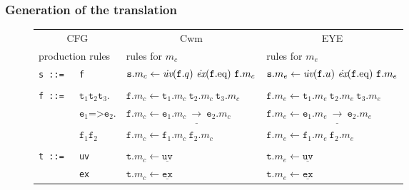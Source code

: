 \subsubsection{Generation of the translation}\label{all}
\begin{figure*}
\begin{minipage}{\textwidth}
\begin{center}\scriptsize
 \begin{tabular}{llll}
\hline
\multicolumn{2}{c}{CFG}& \multicolumn{1}{c}{Cwm} &\multicolumn{1}{c}{EYE}\\
\multicolumn{2}{l}{production rules}& \multicolumn{1}{l}{rules for $m_c$}&  \multicolumn{1}{l}{rules for $m_e$} \\
  \hline
\texttt{s ::=}&\texttt{f}& $ \texttt{s}.m_c \leftarrow   \dot{\operatorname{\textit{uv}}}(\texttt{f}.q)\  \dot{\operatorname{\textit{ex}}}(\texttt{f}.\eq)\ \texttt{f}.m_c $& $ \texttt{s}.m_e \leftarrow   \dot{\operatorname{\textit{uv}}}(\texttt{f}.u)\  \dot{\operatorname{\textit{ex}}}(\texttt{f}.\eq)\ \texttt{f}.m_e $\\
       &&&\\
\texttt{f ::= } &  $ \texttt{t}_1 \texttt{t}_2 \texttt{t}_3.$&   $ \texttt{f}.m_c \leftarrow \texttt{t}_1.m_c\ \texttt{t}_2.m_c\ \texttt{t}_3.m_c$ &  $ \texttt{f}.m_e \leftarrow \texttt{t}_1.m_e\ \texttt{t}_2.m_e\ \texttt{t}_3.m_e$ \\
    &  $\texttt{e}_1 \texttt{=>}  \texttt{e}_2.$& $\texttt{f}.m_c \leftarrow \texttt{e}_1.m_c\ \underline{\rightarrow}\ \texttt{e}_2.m_c$ & $\texttt{f}.m_e \leftarrow \texttt{e}_1.m_e\ \underline{\rightarrow}\ \texttt{e}_2.m_e$\\
    & $ \texttt{f}_1 \texttt{f}_2$ &                $\texttt{f}.m_c \leftarrow \texttt{f}_1.m_c\ \texttt{f}_2.m_c$ &  $\texttt{f}.m_e \leftarrow \texttt{f}_1.m_e\ \texttt{f}_2.m_e$ \\
&&&\\
\texttt{t ::=}& \texttt{uv}\hspace{0.07\textwidth} &                $\texttt{t}.m_c \leftarrow\underline{\texttt{uv}}$ &   $\texttt{t}.m_e \leftarrow\underline{\texttt{uv}}$ \\
            & \texttt{ex} &               $\texttt{t}.m_c \leftarrow \underline{\texttt{ex}}$&   $\texttt{t}.m_e \leftarrow \underline{\texttt{ex}}$\\

\end{tabular}
\end{center}
\end{minipage}
\end{figure*}
